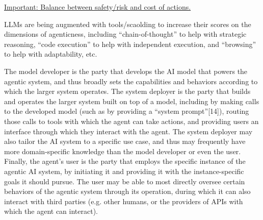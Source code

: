 \documentclass[10pt,a4paper]{article}
\begin{document}
\begin{multicols}{2}
\underline{Important: Balance between safety/risk and cost of actions.}

LLMs are being augmented with tools/scaolding to increase their scores on the dimensions of
agenticness, including “chain-of-thought” to help with strategic reasoning, “code execution” to help with independent
execution, and “browsing” to help with adaptability, etc. 

The model developer is the party that develops
the AI model that powers the agentic system, and thus broadly sets the capabilities and behaviors
according to which the larger system operates. The system deployer is the party that builds and
operates the larger system built on top of a model, including by making calls to the developed model
(such as by providing a “system prompt”[14]), routing those calls to tools with which the agent can
take actions, and providing users an interface through which they interact with the agent. The
system deployer may also tailor the AI system to a specific use case, and thus may frequently have
more domain-specific knowledge than the model developer or even the user. Finally, the agent’s user
is the party that employs the specific instance of the agentic AI system, by initiating it and providing
it with the instance-specific goals it should pursue. The user may be able to most directly oversee
certain behaviors of the agentic system through its operation, during which it can also interact with
third parties (e.g. other humans, or the providers of APIs with which the agent can interact).

\end{multicols} %
\end{document}
